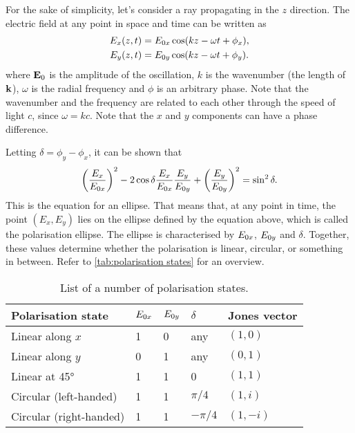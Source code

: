 For the sake of simplicity, let's consider a ray propagating in the $ z $ direction. The electric field at any point in space and time can be written as
\begin{align}
	E_x(z, t) &= E_{0x} \cos(kz-\omega t + \phi_x),\\
	E_y(z, t) &= E_{0y} \cos(kz-\omega t + \phi_y).
\end{align}
where $ \vb{E}_0 $ is the amplitude of the oscillation, $ k $ is the wavenumber (the length of $ \vb{k} $), $ \omega $ is the radial frequency and $ \phi $ is an arbitrary phase. Note that the wavenumber and the frequency are related to each other through the speed of light $ c $, since $ \omega = kc$. Note that the $ x $ and $ y $ components can have a phase difference.

Letting $ \delta = \phi_y-\phi_x $, it can be shown that 
\begin{equation}
	\left(\frac{E_x}{E_{0x}}\right)^2 - 2\cos\delta\frac{E_x}{E_{0x}}\frac{E_y}{E_{0y}} + \left(\frac{E_y}{E_{0y}}\right)^2 = \sin^2\delta.
\end{equation}
This is the equation for an ellipse. That means that, at any point in time, the point $ (E_x, E_y) $ lies on the ellipse defined by the equation above, which is called the polarisation ellipse. The ellipse is characterised by $ E_{0x} $, $ E_{0y} $ and $ \delta $. Together, these values determine whether the polarisation is linear, circular, or something in between. Refer to \autoref{tab:polarisation states} for an overview.
\begin{table}
	\centering
	\caption{List of a number of polarisation states.}
	\label{tab:polarisation states}
	\begin{tabular}{lllll}
		\toprule
		Polarisation state      & $ E_{0x} $ & $ E_{0y} $ & $ \delta $ & Jones vector \\ \midrule
		Linear along $ x $      & 1            & 0            & any        & $ (1, 0) $   \\
		Linear along $ y $      & 0            & 1            & any        & $ (0, 1) $   \\
		Linear at \ang{45}      & 1            & 1            & 0          & $ (1, 1) $   \\
		Circular (left-handed)  & 1            & 1            & $ \pi/4 $  & $ (1, i) $   \\
		Circular (right-handed) & 1            & 1            & $ -\pi/4 $ & $ (1, -i) $  \\ \bottomrule
	\end{tabular}
\end{table}


